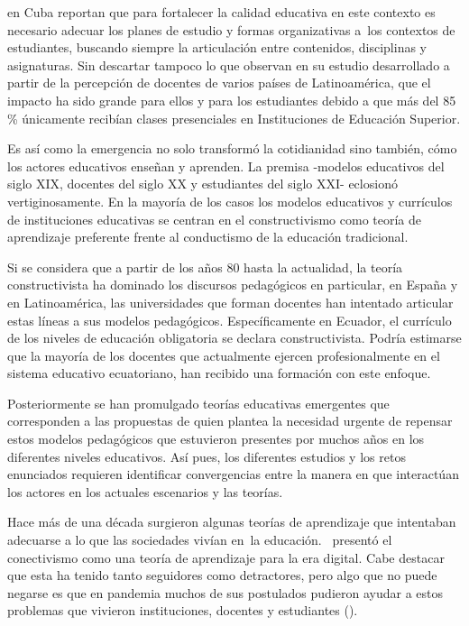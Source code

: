 \documentclass{textolivre}
\begin{document}
\textcite{diaz_quinones_pandemia_2020} en Cuba reportan que para fortalecer la calidad educativa en este contexto es necesario adecuar los planes de estudio y formas organizativas a los contextos de estudiantes, buscando siempre la articulación entre contenidos, disciplinas y asignaturas. Sin descartar tampoco lo que \textcite{silas_casillas_docente_2020} observan en su estudio desarrollado a partir de la percepción de docentes de varios países de Latinoamérica, que el impacto ha sido grande para ellos y para los estudiantes debido a que más del 85 \% únicamente recibían clases presenciales en Instituciones de Educación Superior.

Es así como la emergencia no solo transformó la cotidianidad sino también, cómo los actores educativos enseñan y aprenden. La premisa -modelos educativos del siglo XIX, docentes del siglo XX y estudiantes del siglo XXI- eclosionó vertiginosamente. En la mayoría de los casos los modelos educativos y currículos de instituciones educativas se centran en el constructivismo como teoría de aprendizaje preferente frente al conductismo de la educación tradicional. 

Si se considera que a partir de los años 80 hasta la actualidad, la teoría constructivista ha dominado los discursos pedagógicos en particular, en España y en Latinoamérica, las universidades que forman docentes han intentado articular estas líneas a sus modelos pedagógicos. Específicamente en Ecuador, el currículo de los niveles de educación obligatoria \cite{ministerio_de_educacion_de_ecuador_curriculo_2016} se declara constructivista. Podría estimarse que la mayoría de los docentes que actualmente ejercen profesionalmente en el sistema educativo ecuatoriano, han recibido una formación con este enfoque. 

Posteriormente se han promulgado teorías educativas emergentes que corresponden a las propuestas de \textcite{bonilla-guachamin_dos_2020} quien plantea la necesidad urgente de repensar estos modelos pedagógicos que estuvieron presentes por muchos años en los diferentes niveles educativos. Así pues, los diferentes estudios y los retos enunciados requieren identificar convergencias entre la manera en que interactúan los actores en los actuales escenarios y las teorías. 

Hace más de una década surgieron algunas teorías de aprendizaje que intentaban adecuarse a lo que las sociedades vivían en la educación. \textcite{siemens_connectivism:_2004, siemens_connectivism:_2005} presentó el conectivismo como una teoría de aprendizaje para la era digital. Cabe destacar que esta ha tenido tanto seguidores como detractores, pero algo que no puede negarse es que en pandemia muchos de sus postulados pudieron ayudar a estos problemas que vivieron instituciones, docentes y estudiantes ().
\end{document}
